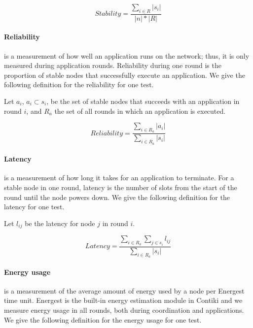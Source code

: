 \begin{newtext}
\begin{Definitions}{}{}
\begin{equation*}
    Stability = \frac{\sum\limits_{i \in R}{|s_i|}}{|n|*|R|}
\end{equation*}

\end{Definitions}

\paragraph*{Reliability} is a measurement of how well an application runs on the network; thus, it is only measured during application rounds. Reliability during one round is the proportion of stable nodes that successfully execute an application. We give the following definition for the reliability for one test.

\begin{Definitions}{}{}
Let $a_i$, $a_i \subset s_i$, be the set of stable nodes that succeeds with an application in round $i$, and $R_a$ the set of all rounds in which an application is executed.


\begin{equation*}
    Reliability = \frac{\sum\limits_{i \in R_a}{|a_i|}}{\sum\limits_{i \in R_a}{|s_i|}}
\end{equation*}

\end{Definitions}


\paragraph*{Latency} is a measurement of how long it takes for an application to terminate. For a stable node in one round, latency is the number of slots from the start of the round until the node powers down. We give the following definition for the latency for one test.

\begin{Definitions}{}{}
Let $l_{ij}$ be the latency for node $j$ in round $i$.

\begin{equation*}
    Latency = \frac{\sum\limits_{i \in R_a}{ \sum\limits_{j \in s_i}{l_{ij} } }}{\sum\limits_{i \in R_a}|s_i|}
\end{equation*}
\end{Definitions}


\paragraph*{Energy usage} is a measurement of the average amount of energy used by a node per Energest time unit. Energest is the built-in energy estimation module in Contiki and we measure energy usage in all rounds, both during coordination and applications. We give the following definition for the energy usage for one test.



\end{newtext}
